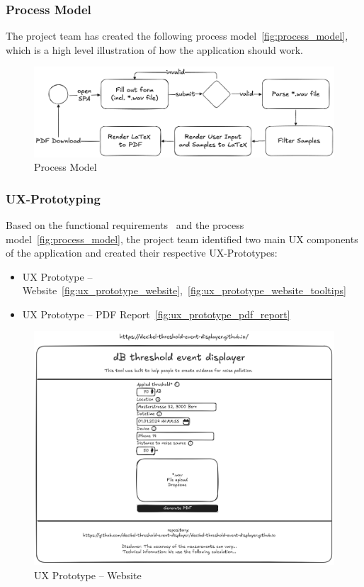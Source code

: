 \subsubsection{Process Model}\label{subsubsec:process_model}
The project team has created the following process model~\autoref{fig:process_model}, which is a high level illustration of how the application should work.

\begin{figure}[H]
    \centering
    \includegraphics[width=1\textwidth]{../assets/process_model.png}
    \caption{Process Model}\label{fig:process_model}
\end{figure}

\subsubsection{UX-Prototyping}\label{subsubsec:ux_prototyping}
Based on the functional requirements~ and the process model~\autoref{fig:process_model}, the project team identified two main UX components of the application and created their respective UX-Prototypes:
\begin{itemize}
    \item UX Prototype – Website~\autoref{fig:ux_prototype_website},~\autoref{fig:ux_prototype_website_tooltips}
    \item UX Prototype – PDF Report~\autoref{fig:ux_prototype_pdf_report}
\end{itemize}

\begin{figure}[H]
    \centering
    \includegraphics[width=1\textwidth]{../assets/ux_prototype_website.png}
    \caption{UX Prototype – Website}\label{fig:ux_prototype_website}
\end{figure}


